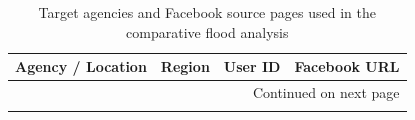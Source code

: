 {\small
	\setlength{\tabcolsep}{3pt}
	\begin{longtable}{@{}
			l                                     %
			l                                     %
			l                                     %
			>{\raggedright\arraybackslash}p{5.75cm} %
			@{}}
		
		\caption{Target agencies and Facebook source pages used in the comparative flood analysis}
		\label{tab:target-agencies}\\
		
		\toprule
		\textbf{Agency / Location} & \textbf{Region} & \textbf{User ID} & \textbf{Facebook URL} \\
		\midrule
		\endhead
		
		\midrule
		\multicolumn{4}{r}{Continued on next page} \\
		\endfoot
		
		\bottomrule
		\endlastfoot
		

\end{longtable}}
